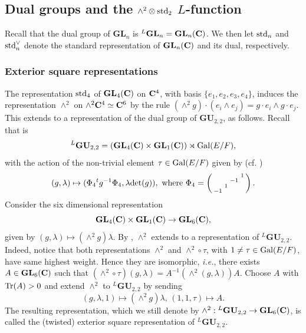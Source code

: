 \documentclass[11pt, reqno]{amsart}
\theoremstyle{plain}
\theoremstyle{definition}
\theoremstyle{remark}
\theoremstyle{plain}
\def\C{{\bf C}}
\def\GU{{\mathbf{GU}}}
\def\GL{\mathbf{GL}}
\begin{document}
\subsection{Dual groups and the $\wedge^2  \otimes {\rm std}_2$ $L$-function}\label{subsec_dualgroups}

Recall that the dual group of  $\GL_n$ is ${}^L\GL_n = \GL_n(\C)$. We then let 
${\rm std}_n$  and ${\rm std}_n^\vee$ denote the standard representation of $\GL_n(\C)$ and its dual, respectively.

\subsubsection{Exterior square representations}

The representation ${\rm std}_4$ of $\GL_4(\C)$ on $\C^4$, with basis $\{e_1,e_2,e_3,e_4\}$, induces the representation $\wedge^2$ on $\wedge^2 \C^4 \simeq \C^6$ by the rule $(\wedge^2 g) \cdot ( e_i \wedge e_j) = g \cdot e_i \wedge g \cdot e_j$. This extends to a representation of the dual group of $\GU_{2,2}$, as follows. 
Recall that is \[ {}^L\GU_{2,2} = ( \GL_4(\C) \times \GL_1(\C)) \rtimes {\rm Gal}(E/F),  \]
with the action of the non-trivial element $\tau \in {\rm Gal}(E/F)$ given by (cf. \cite[\S 1.8(c)]{BlasiusRogawski})
\[ (g,\lambda) \mapsto (\Phi_4 {}^tg^{-1} \Phi_4 , \lambda {\rm det}(g)), \text{ where }  \Phi_4 = \left( \begin{smallmatrix}  & & &1\\&&-1& \\ & 1&&\\ -1& & & \end{smallmatrix} \right). \] 
Consider the six dimensional representation \[ \GL_4(\C) \times \GL_1(\C) \to \GL_6(\C),\] given by $ (g,\lambda) \mapsto  (\wedge^2 g) \lambda$. By \cite[Lemma 2.1]{KimK}, $\wedge^2$ extends to a representation of ${}^L\GU_{2,2}$. Indeed, notice that both representations $\wedge^2$ and $\wedge^2 \circ \tau$, with $1 \ne \tau \in {\rm Gal}(E/F)$, have same highest weight. Hence they are isomorphic, \textit{i.e.}, there exists $A \in \GL_6(\C)$ such that  $(\wedge^2 \circ \tau) (g,\lambda) = A^{-1} ( \wedge^2  (g,\lambda) ) A$. Choose $A$ with ${\rm Tr}(A) >0$ and extend $\wedge^2$ to ${}^L\GU_{2,2}$ by sending \[ (g,\lambda,1) \mapsto (\wedge^2g)\lambda,\, (1,1,\tau) \mapsto A.\]
The resulting representation, which we still denote by $\wedge^2: {}^L\GU_{2,2} \to \GL_6(\C)$, is called the (twisted) exterior square representation of ${}^L\GU_{2,2}$.  
\end{document}
